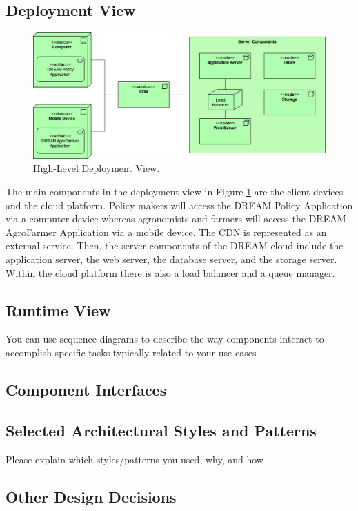 \subsection{Deployment View}
\begin{figure}[hbt!]
\centering
\includegraphics[width=\textwidth]{../images_diagrams/dd/highlevel_deployment.png}
\caption{High-Level Deployment View.}
\label{fig:highLevelDeploy}
\end{figure}

\begin{flushleft}
The main components in the deployment view in Figure \ref{fig:highLevelDeploy} are the client devices and the cloud platform. Policy makers will access the DREAM Policy Application via a computer device whereas agronomists and farmers will access the DREAM AgroFarmer Application via a mobile device. The CDN is represented as an external service. Then, the server components of the DREAM cloud include the application server, the web server, the database server, and the storage server. Within the cloud platform there is also a load balancer and a queue manager.
\end{flushleft}




\subsection{Runtime View}
You can use sequence diagrams to describe the way components interact
to accomplish specific tasks typically related to your use cases
\subsection{Component Interfaces}
\subsection{Selected Architectural Styles and Patterns}
Please explain which styles/patterns you used, why, and how
\subsection{Other Design Decisions}